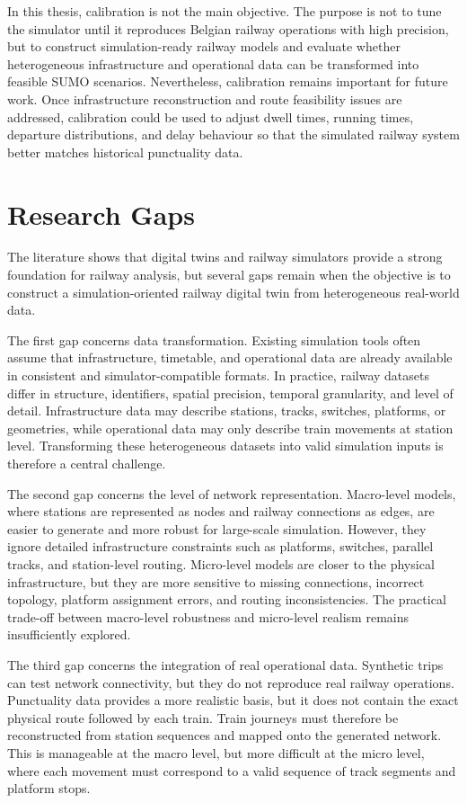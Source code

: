 In this thesis, calibration is not the main objective. The purpose is not to tune the simulator until it reproduces 
Belgian railway operations with high precision, but to construct simulation-ready railway models and evaluate whether 
heterogeneous infrastructure and operational data can be transformed into feasible SUMO scenarios. Nevertheless, 
calibration remains important for future work. Once infrastructure reconstruction and route feasibility issues are 
addressed, calibration could be used to adjust dwell times, running times, departure distributions, and delay behaviour so 
that the simulated railway system better matches historical punctuality data.


\section{Research Gaps}
The literature shows that digital twins and railway simulators provide a strong foundation for railway analysis, but 
several gaps remain when the objective is to construct a simulation-oriented railway digital twin from heterogeneous 
real-world data.

The first gap concerns data transformation. Existing simulation tools often assume that infrastructure, timetable, and 
operational data are already available in consistent and simulator-compatible formats. In practice, railway datasets 
differ in structure, identifiers, spatial precision, temporal granularity, and level of detail. Infrastructure data may 
describe stations, tracks, switches, platforms, or geometries, while operational data may only describe train movements at 
station level. Transforming these heterogeneous datasets into valid simulation inputs is therefore a central challenge.

The second gap concerns the level of network representation. Macro-level models, where stations are represented as nodes 
and railway connections as edges, are easier to generate and more robust for large-scale simulation. However, they ignore 
detailed infrastructure constraints such as platforms, switches, parallel tracks, and station-level routing. Micro-level 
models are closer to the physical infrastructure, but they are more sensitive to missing connections, incorrect topology, 
platform assignment errors, and routing inconsistencies. The practical trade-off between macro-level robustness and 
micro-level realism remains insufficiently explored.

The third gap concerns the integration of real operational data. Synthetic trips can test network connectivity, but they 
do not reproduce real railway operations. Punctuality data provides a more realistic basis, but it does not contain the 
exact physical route followed by each train. Train journeys must therefore be reconstructed from station sequences and 
mapped onto the generated network. This is manageable at the macro level, but more difficult at the micro level, where 
each movement must correspond to a valid sequence of track segments and platform stops.

